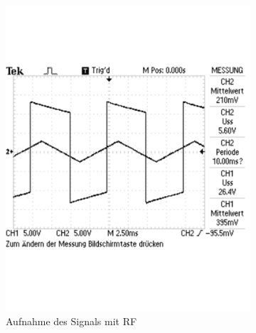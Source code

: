 \documentclass[12pt,a4paper]{article}
\begin{document}
\begin{figure}[H]
        \centering
        \begin{subfigure}[b]{0.48\textwidth}
                \includegraphics[width=\textwidth , scale = 0.4]{2_7_mit_rf.pdf}
                \caption[Aufnahme des Signals mit RF]{Aufnahme des Signals mit RF}
 				 \label{fig:2_7_mit_rf}
        \end{subfigure}%
        \hfill
        \begin{subfigure}[b]{0.48\textwidth}

\end{subfigure}
\end{figure}
\end{document}
